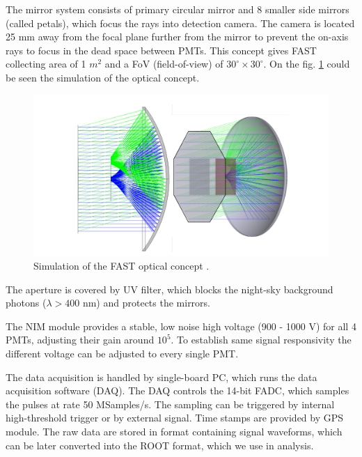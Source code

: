 \par

The mirror system consists of primary circular mirror and 8 smaller side mirrors (called petals), which focus the rays into detection camera. The camera is located 25 mm away from the focal plane further from the mirror to prevent the on-axis rays to focus in the dead space between PMTs. This concept gives FAST collecting area of 1 $m^2$ and a FoV (field-of-view) of $30^{\circ} \times 30^{\circ}$. On the fig. \ref{FASTConc} could be seen the simulation of the optical concept.



\begin{figure}[H]
 \centering
 \includegraphics[scale = 0.2]{./pictures/FASTfocusing}
 \caption{Simulation of the FAST optical concept \cite{Mandat_2017}.}
 \label{FASTConc}
 
\end{figure}


\par
The aperture is covered by UV filter, which blocks the night-sky background photons ($\lambda > 400$ nm) and protects the mirrors.


\par
The NIM module provides a stable, low noise high voltage (900 - 1000 V) for all 4 PMTs, adjusting their gain around $10^5$. To establish same signal responsivity the different voltage can be adjusted to every single PMT.
\par
The data acquisition is handled by single-board PC, which runs the data acquisition software (DAQ). The DAQ controls the 14-bit FADC, which samples the pulses at rate 50 MSamples/s. The sampling can be triggered by internal high-threshold trigger or by external signal. Time stamps are provided by GPS module. The raw data are stored in format containing signal waveforms, which can be later converted into the ROOT format, which we use in analysis.
